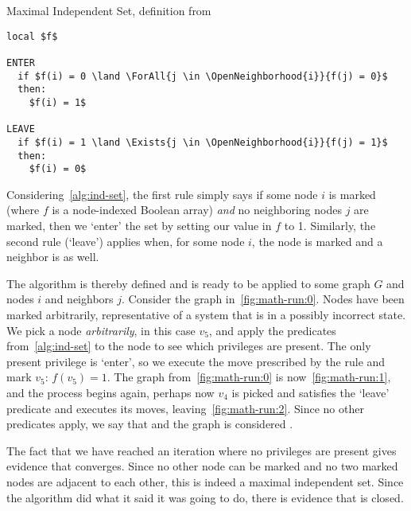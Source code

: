\begin{algorithm}[float]
  \caption{Maximal Independent Set, definition from \autocite{goddard:ssa--k-distance}}
  \label{alg:ind-set}
\begin{lstlisting}[language=ssa]
local $f$

ENTER
  if $f(i) = 0 \land \ForAll{j \in \OpenNeighborhood{i}}{f(j) = 0}$
  then:
    $f(i) = 1$

LEAVE
  if $f(i) = 1 \land \Exists{j \in \OpenNeighborhood{i}}{f(j) = 1}$
  then:
    $f(i) = 0$
\end{lstlisting}
\end{algorithm}

Considering~\autoref{alg:ind-set},
  the first rule simply says if some node $i$ is marked
  (where $f$ is a node-indexed Boolean array)
  \emph{and} no neighboring nodes $j$ are marked,
  then we \enquote*{enter} the set by setting our value in $f$ to 1.
Similarly, the second rule (\enquote*{leave})
  applies when, for some node $i$, the node is marked and a neighbor is as well.

The algorithm is thereby defined and is ready to be applied to
  some graph $G$ and nodes $i$ and neighbors $j$.
Consider the graph in~\autoref{fig:math-run:0}.
Nodes have been marked arbitrarily,
  representative of a system that is in a possibly incorrect state.
We pick a node \emph{arbitrarily}, in this case $v_5$,
  and apply the predicates from~\autoref{alg:ind-set} to the node
  to see which privileges are present.
The only present privilege is \enquote*{enter},
  so we execute the move prescribed by the rule and mark $v_5$: $f(v_5)=1$.
The graph from~\autoref{fig:math-run:0} is now~\autoref{fig:math-run:1},
  and the process begins again, perhaps now $v_4$ is picked and
  satisfies the \enquote*{leave} predicate and executes its moves,
  leaving~\autoref{fig:math-run:2}.
Since no other predicates apply, we say that 
  and the graph is considered .

The fact that we have reached an iteration where no privileges are present
  gives evidence that  converges.
Since no other node can be marked and no two marked nodes are adjacent to each other,
  this is indeed a maximal independent set.
Since the algorithm did what it said it was going to do,
  there is evidence that  is closed.

